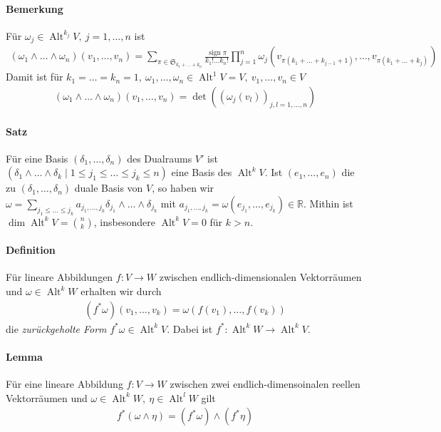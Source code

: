 \documentclass[12pt,a4paper,fleqn]{article}
\def\R{{\mathbb{R}}}
\begin{document}
\paragraph{Bemerkung} Für $\omega_j \in \operatorname{Alt}^{k_j} V,\ j = 1, \dotsc, n$ ist
\begin{align*}
(\omega_1\wedge \dotsc\wedge \omega_n)(v_1, \dotsc, v_n) = \sum_{\pi \in \mathfrak{S}_{k_1+\dotsc +k_n}} \frac{\operatorname{sign}\pi}{k_1!\dotsc k_n!} \prod_{j=1}^n \omega_j (v_{ \pi(k_1+\dotsc +k_{j-1}+1)}, \dotsc, v_{\pi(k_1+\dotsc+k_j)})
\end{align*}
Damit ist für $k_1 = \dotsc = k_n = 1,\ \omega_1, \dotsc, \omega_n \in \operatorname{Alt}^1 V = V,\ v_1, \dotsc, v_n \in V$
\begin{align*}
(\omega_1\wedge\dotsc\wedge\omega_n)(v_1, \dotsc, v_n) = \det ((\omega_j(v_l))_{j, l = 1, \dotsc, n})
\end{align*}

\paragraph{Satz} Für eine Basis $(\delta_1, \dotsc, \delta_n)$ des Dualraums $V'$ ist ${(\delta_1\wedge\dotsc\wedge\delta_k \mid 1\leq j_1\leq\dotsc\leq j_k \leq n)}$ eine Basis des $\operatorname{Alt}^k V$. 
Ist $(e_1, \dotsc, e_n)$ die zu $(\delta_1, \dotsc, \delta_n)$ duale Basis von $V$, so haben wir $\omega = \sum_{j_1\leq \dotsc\leq j_k} a_{j_1, \dotsc, j_k} \delta_{j_1}\wedge\dotsc\wedge\delta_{j_k}$ mit $a_{j_1, \dotsc, j_k} = \omega(e_{j_1}, \dotsc, e_{j_k})\in \R$. 
Mithin ist $\dim\operatorname{Alt}^k V = \binom{n}{k}$, insbesondere $\operatorname{Alt}^k V = 0$ für $k > n$.

\paragraph{Definition} Für lineare Abbildungen $f\colon V \rightarrow W$ zwischen endlich-dimensionalen Vektorräumen und $\omega \in \operatorname{Alt}^k W$ erhalten wir durch 
\begin{align*}
(f^\ast\omega)(v_1, \dotsc, v_k) = \omega(f(v_1), \dotsc, f(v_k))
\end{align*}
die \textit{zurückgeholte Form} $f^\ast\omega \in \operatorname{Alt}^k V$. Dabei ist $f^\ast\colon \operatorname{Alt}^k W \rightarrow \operatorname{Alt}^k V$.

\paragraph{Lemma} Für eine lineare Abbildung $f\colon V \rightarrow W$ zwischen zwei endlich-dimensoinalen reellen Vektorräumen und $\omega\in \operatorname{Alt}^k W,\ \eta \in \operatorname{Alt}^l W$ gilt
\begin{align*}
f^\ast(\omega\wedge\eta) = (f^\ast\omega)\wedge(f^\ast\eta)
\end{align*}
\end{document}
